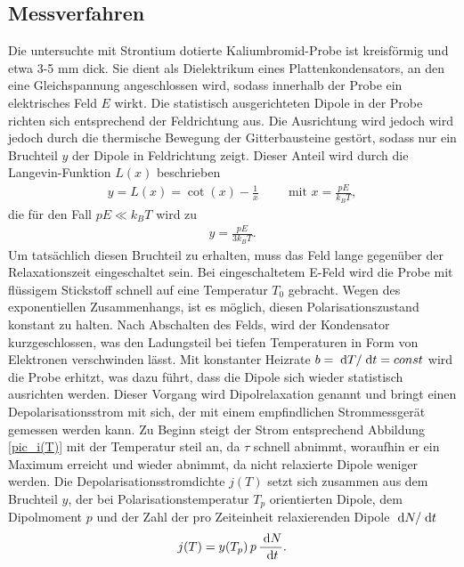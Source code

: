 \subsection{Messverfahren}
Die untersuchte mit Strontium dotierte Kaliumbromid-Probe ist kreisförmig und etwa 3-5 mm dick. Sie dient als Dielektrikum eines Plattenkondensators,
an den eine Gleichspannung angeschlossen wird, sodass innerhalb der Probe ein elektrisches Feld $E$ wirkt. Die statistisch ausgerichteten 
Dipole in der Probe richten sich entsprechend der Feldrichtung aus. Die Ausrichtung wird jedoch wird jedoch durch die thermische Bewegung der 
Gitterbausteine gestört, sodass nur ein Bruchteil $y$ der Dipole in Feldrichtung zeigt. Dieser Anteil wird durch die Langevin-Funktion $L(x)$
beschrieben
\begin{align}
 y = L(x) = \cot(x) - \frac{1}{x} \hspace{1cm}\text{mit }x=\frac{pE}{k_B T},
\end{align}
die für den Fall $pE\ll k_B T$ wird zu 
\begin{align}
 y = \frac{pE}{3k_B T}.
\end{align}
Um tatsächlich diesen Bruchteil zu erhalten, muss das Feld lange gegenüber der Relaxationszeit eingeschaltet sein. Bei eingeschaltetem E-Feld wird
die Probe mit flüssigem Stickstoff schnell auf eine Temperatur $T_0$ gebracht. Wegen des exponentiellen Zusammenhangs, ist es möglich, diesen
Polarisationszustand konstant zu halten. Nach Abschalten des Felds, wird der Kondensator kurzgeschlossen, was den Ladungsteil bei tiefen Temperaturen
in Form von Elektronen verschwinden lässt. Mit konstanter Heizrate $b=\; \mathrm{d} T/\; \mathrm{d} t = const$ wird die Probe erhitzt, was dazu führt, dass die Dipole
sich wieder statistisch ausrichten werden. Dieser Vorgang wird Dipolrelaxation genannt und bringt einen Depolarisationsstrom mit sich, der mit einem
empfindlichen Strommessgerät gemessen werden kann. Zu Beginn steigt der Strom entsprechend Abbildung \ref{pic_i(T)} mit der Temperatur steil an, da $\tau$ schnell abnimmt, woraufhin er
ein Maximum erreicht und wieder abnimmt, da nicht relaxierte Dipole weniger werden. Die Depolarisationsstromdichte $j(T)$ setzt sich zusammen aus dem
Bruchteil $y$, der bei Polarisationstemperatur $T_p$ orientierten Dipole, dem Dipolmoment $p$ und der Zahl der pro Zeiteinheit relaxierenden Dipole
$\; \mathrm{d} N/\; \mathrm{d} t$
\begin{align}
 j(T) = y(T_p)\, p\, \frac{\; \mathrm{d} N}{\; \mathrm{d} t}.
\end{align}
